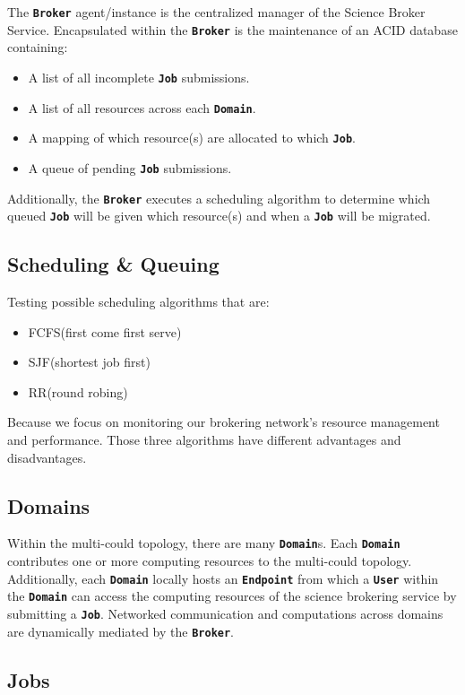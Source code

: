 \documentclass{ReportCUNY}
\newcommand{\KeyWord}[1]{\textbf{\texttt{#1}}}
\begin{document}
The \KeyWord{Broker} agent/instance is the centralized manager of the Science Broker Service.
Encapsulated within the \KeyWord{Broker} is the maintenance of an ACID database containing:
\begin{itemize}
\item A list of all incomplete \KeyWord{Job} submissions.
\item A list of all resources across each \KeyWord{Domain}.
\item A mapping of which resource(s) are allocated to which \KeyWord{Job}.
\item A queue of pending \KeyWord{Job} submissions.
\end{itemize}

Additionally, the \KeyWord{Broker} executes a scheduling algorithm to determine which queued \KeyWord{Job} will be given which resource(s) and when a \KeyWord{Job} will be migrated.


\subsection{Scheduling \& Queuing}

Testing possible scheduling algorithms that are:
\begin{itemize}
\item FCFS(first come first serve)
\item SJF(shortest job first)
\item RR(round robing)
\end{itemize}

Because we focus on monitoring our brokering network's resource management and performance. Those three algorithms have different advantages and disadvantages. 


\subsection{Domains}

Within the multi-could topology, there are many \KeyWord{Domain}s.
Each \KeyWord{Domain} contributes one or more computing resources to the multi-could topology.
Additionally, each \KeyWord{Domain} locally hosts an \KeyWord{Endpoint} from which a \KeyWord{User} within the \KeyWord{Domain} can access the computing resources of the science brokering service by submitting a \KeyWord{Job}.
Networked communication and computations across domains are dynamically mediated by the \KeyWord{Broker}.


\subsection{Jobs}
\end{document}
